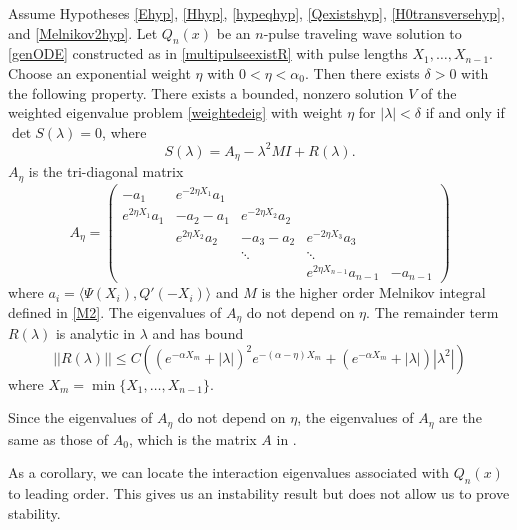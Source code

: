 \documentclass[thesis.tex]{subfiles}
\begin{document}
\begin{theorem}\label{expwtstabtheorem}
Assume Hypotheses \ref{Ehyp}, \ref{Hhyp}, \ref{hypeqhyp}, \ref{Qexistshyp}, \ref{H0transversehyp}, and \ref{Melnikov2hyp}. Let $Q_n(x)$ be an $n$-pulse traveling wave solution to \cref{genODE} constructed as in \cref{multipulseexistR} with pulse lengths $X_1, \dots, X_{n-1}$. Choose an exponential weight $\eta$ with $0 < \eta < \alpha_0$. Then there exists $\delta > 0$ with the following property. There exists a bounded, nonzero solution $V$ of the weighted eigenvalue problem \eqref{weightedeig} with weight $\eta$ for $|\lambda| < \delta$ if and only if $\det S(\lambda) = 0$, where
\[
S(\lambda) = A_\eta - \lambda^2 M I + R(\lambda).
\]
$A_\eta$ is the tri-diagonal matrix
\begin{equation}\label{Aeta}
A_\eta = \begin{pmatrix}
-a_1 & e^{-2 \eta X_1} a_1 \\
e^{2 \eta X_1} a_1 & -a_2 - a_1 & e^{-2 \eta X_2} a_2 \\
& e^{2 \eta X_2} a_2 & -a_3 - a_2 & e^{-2 \eta X_3} a_3 \\
&& \ddots & \ddots \\
& & & e^{2 \eta X_{n-1}} a_{n-1} & -a_{n-1} 
\end{pmatrix}
\end{equation}
where $a_i = \langle \Psi(X_i), Q'(-X_i) \rangle$ and $M$ is the higher order Melnikov integral defined in \cref{M2}. The eigenvalues of $A_\eta$ do not depend on $\eta$. The remainder term $R(\lambda)$ is analytic in $\lambda$ and has bound
\begin{equation*}
||R(\lambda)|| \leq C 
\left( (e^{-\alpha X_m} + |\lambda|)^2 e^{-(\alpha - \eta)X_m}  
+ (e^{-\alpha X_m} + |\lambda| )|\lambda^2| \right)
\end{equation*}
where $X_m = \min\{X_1, \dots, X_{n-1}\}$.
\end{theorem}

\begin{remark}
Since the eigenvalues of $A_\eta$ do not depend on $\eta$, the eigenvalues of $A_\eta$ are the same as those of $A_0$, which is the matrix $A$ in \cite[(2.8)]{Sandstede1998}.
\end{remark}

As a corollary, we can locate the interaction eigenvalues associated with $Q_n(x)$ to leading order. This gives us an instability result but does not allow us to prove stability.
\end{document}
